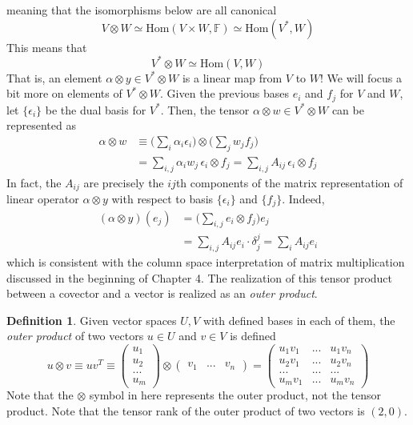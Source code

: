 \documentclass{article}
\theoremstyle{remark}
\theoremstyle{definition}
\newtheorem{definition}{Definition}[section]
\begin{document}
    meaning that the isomorphisms below are all canonical
    \[V \otimes W \simeq \text{Hom}(V \times W, \mathbb{F}) \simeq \text{Hom}(V^*, W)\]
    This means that
    \[V^* \otimes W \simeq \text{Hom}(V, W)\]
    That is, an element $\alpha \otimes y \in V^* \otimes W$ is a linear map from $V$ to $W$! We will focus a bit more on elements of $V^* \otimes W$. Given the previous bases $e_i$ and $f_j$ for $V$ and $W$, let $\{\epsilon_i\}$ be the dual basis for $V^*$. Then, the tensor $\alpha \otimes w \in V^* \otimes W$ can be represented as 
    \begin{align*}
        \alpha \otimes w & \equiv \bigg(\sum_i \alpha_i \epsilon_i \bigg) \otimes \bigg( \sum_j w_j f_j \bigg) \\
        & = \sum_{i, j} \alpha_i w_j \, \epsilon_i \otimes f_j = \sum_{i, j} A_{i j} \, \epsilon_i \otimes f_j
    \end{align*}
    In fact, the $A_{i j}$ are precisely the $i j$th components of the matrix representation of linear operator $\alpha \otimes y$ with respect to basis $\{\epsilon_i\}$ and $\{f_j\}$. Indeed,
    \begin{align*}
        (\alpha \otimes y)(e_j) & = \bigg( \sum_{i, j} e_i \otimes f_j \bigg) e_j \\
        & = \sum_{i, j} A_{i j} e_i \cdot \delta^j_j = \sum_{i} A_{i j} e_i
    \end{align*}
    which is consistent with the column space interpretation of matrix multiplication discussed in the beginning of Chapter 4. The realization of this tensor product between a covector and a vector is realized as an \textit{outer product}. 

    \begin{definition}
    Given vector spaces $U, V$ with defined bases in each of them, the \textit{outer product} of two vectors $u \in U$ and $v \in V$ is defined
    \[u \otimes v \equiv u v^T \equiv \begin{pmatrix}
    u_1 \\ u_2 \\ ... \\ u_m
    \end{pmatrix} \otimes \begin{pmatrix}
    v_1 & ... & v_n
    \end{pmatrix} = \begin{pmatrix}
    u_1 v_1 & ... & u_1 v_n \\
    u_2 v_1 & ... & u_2 v_n \\
    ... & ... & ... \\
    u_m v_1 & ... & u_m v_n 
    \end{pmatrix}\]
    Note that the $\otimes$ symbol in here represents the outer product, not the tensor product. Note that the tensor rank of the outer product of two vectors is $(2,0)$. 
    \end{definition}
\end{document}

